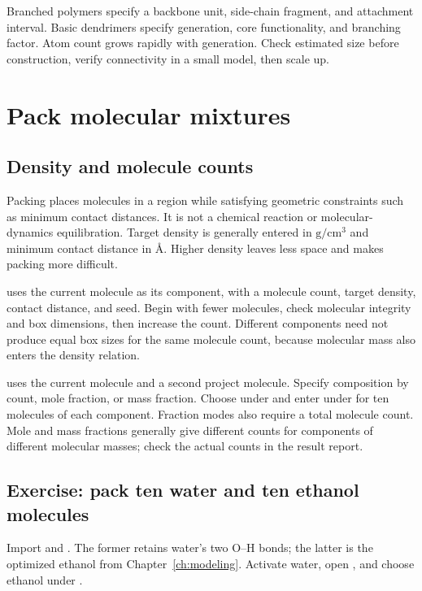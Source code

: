 Branched polymers specify a backbone unit, side-chain fragment, and attachment interval. Basic dendrimers specify generation, core functionality, and branching factor. Atom count grows rapidly with generation. Check estimated size before construction, verify connectivity in a small model, then scale up.

\section{Pack molecular mixtures}

\subsection{Density and molecule counts}

Packing places molecules in a region while satisfying geometric constraints such as minimum contact distances. It is not a chemical reaction or molecular-dynamics equilibration. Target density is generally entered in $\mathrm{g/cm^3}$ and minimum contact distance in \AA. Higher density leaves less space and makes packing more difficult.

 uses the current molecule as its component, with a molecule count, target density, contact distance, and seed. Begin with fewer molecules, check molecular integrity and box dimensions, then increase the count. Different components need not produce equal box sizes for the same molecule count, because molecular mass also enters the density relation.

 uses the current molecule and a second project molecule. Specify composition by count, mole fraction, or mass fraction. Choose  under  and enter  under  for ten molecules of each component. Fraction modes also require a total molecule count. Mole and mass fractions generally give different counts for components of different molecular masses; check the actual counts in the result report.

\subsection{Exercise: pack ten water and ten ethanol molecules}

Import  and . The former retains water's two O--H bonds; the latter is the optimized ethanol from Chapter~\ref{ch:modeling}. Activate water, open , and choose ethanol under .

